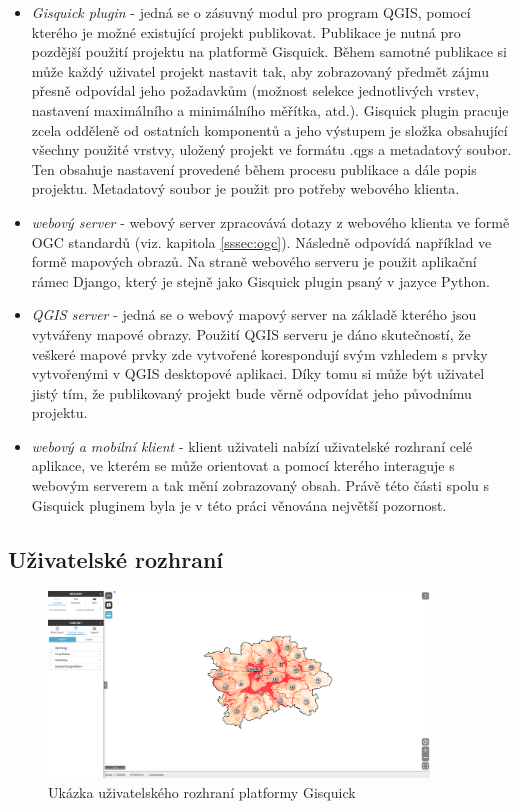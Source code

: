 \begin{itemize}
\item\textit{Gisquick plugin} - jedná se o zásuvný modul pro
program QGIS, pomocí kterého je možné existující projekt
publikovat. Publikace je nutná pro pozdější použití projektu
na platformě Gisquick. Během samotné publikace si může každý
uživatel projekt nastavit tak, aby zobrazovaný předmět zájmu
přesně odpovídal jeho požadavkům (možnost selekce jednotlivých
vrstev, nastavení maximálního a minimálního měřítka,
atd.). Gisquick plugin pracuje zcela odděleně od ostatních
komponentů a jeho výstupem je složka obsahující všechny použité
vrstvy, uložený projekt ve formátu .qgs a metadatový soubor. Ten
obsahuje nastavení provedené během procesu publikace a dále popis
projektu. Metadatový soubor je použit pro potřeby webového klienta.
\item\textit{webový server} - webový server zpracovává
dotazy z webového klienta ve formě OGC standardů (viz. kapitola
\ref{sssec:ogc}). Následně odpovídá například ve formě mapových
obrazů. Na straně webového serveru je použit aplikační rámec Django,
který je stejně jako Gisquick plugin psaný v jazyce Python.
\item\textit{QGIS server} - jedná se o webový mapový server
na základě kterého jsou vytvářeny mapové obrazy. Použití
QGIS serveru je dáno skutečností, že veškeré mapové prvky
zde vytvořené korespondují svým vzhledem s prvky vytvořenými
v QGIS desktopové aplikaci. Díky tomu si může být uživatel
jistý tím, že publikovaný projekt bude věrně odpovídat jeho
původnímu projektu.
\item\textit{webový a mobilní klient} - klient uživateli nabízí
uživatelské rozhraní celé aplikace, ve kterém se může
orientovat a pomocí kterého interaguje s webovým serverem a tak
mění zobrazovaný obsah. Právě této části spolu s Gisquick
pluginem byla je v této práci věnována největší pozornost.
\end{itemize}

\subsection{Uživatelské rozhraní}

\begin{figure}[h!]
\centering
\includegraphics[width=0.9\textwidth]{../img/gisquick_ui.png}
\caption{Ukázka uživatelského rozhraní platformy
Gisquick\cite{gisquick-prague}}
\label{fig:gisquick-prague}
\end{figure}

